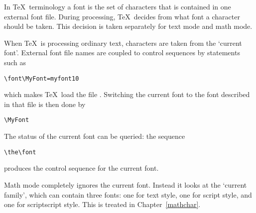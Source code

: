 In  \TeX\ terminology a font is the set of characters that
is contained in one external font file. 
During processing, \TeX\ decides from
what font a character should be taken. This decision is
taken separately for text mode and math mode.

When \TeX\ is processing ordinary text, characters are taken
from the `current font'. 
External font file names are coupled to  control sequences
by   statements such as
\begin{verbatim}
\font\MyFont=myfont10
\end{verbatim}
which makes \TeX\ load the file .
Switching the current font to the font described in that file
is then done by
\begin{verbatim}
\MyFont
\end{verbatim}
The status of the current font
can be queried: the sequence
\begin{verbatim}
\the\font
\end{verbatim}
produces the control sequence for the current font.

Math mode completely ignores the current font. Instead
it looks  at the `current family', which can contain
three fonts: one for text style, one for script style,
and one for scriptscript style. This is treated
in Chapter~\ref{mathchar}.

